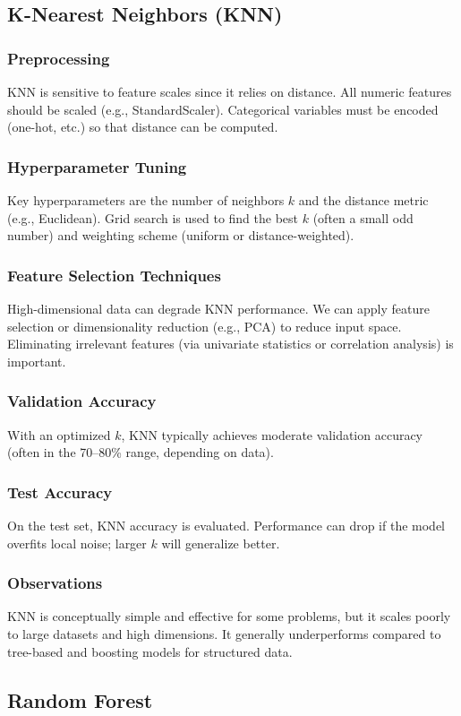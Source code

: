 \documentclass[12pt]{article}
\begin{document}
\subsection{K-Nearest Neighbors (KNN)}
\subsubsection{Preprocessing}
KNN is sensitive to feature scales since it relies on distance. All numeric features should be scaled (e.g., StandardScaler). Categorical variables must be encoded (one-hot, etc.) so that distance can be computed.
\subsubsection{Hyperparameter Tuning}
Key hyperparameters are the number of neighbors $k$ and the distance metric (e.g., Euclidean). Grid search is used to find the best $k$ (often a small odd number) and weighting scheme (uniform or distance-weighted).
\subsubsection{Feature Selection Techniques}
High-dimensional data can degrade KNN performance. We can apply feature selection or dimensionality reduction (e.g., PCA) to reduce input space. Eliminating irrelevant features (via univariate statistics or correlation analysis) is important.
\subsubsection{Validation Accuracy}
With an optimized $k$, KNN typically achieves moderate validation accuracy (often in the 70--80\% range, depending on data).
\subsubsection{Test Accuracy}
On the test set, KNN accuracy is evaluated. Performance can drop if the model overfits local noise; larger $k$ will generalize better.
\subsubsection{Observations}
KNN is conceptually simple and effective for some problems, but it scales poorly to large datasets and high dimensions. It generally underperforms compared to tree-based and boosting models for structured data.

\subsection{Random Forest}
\end{document}
